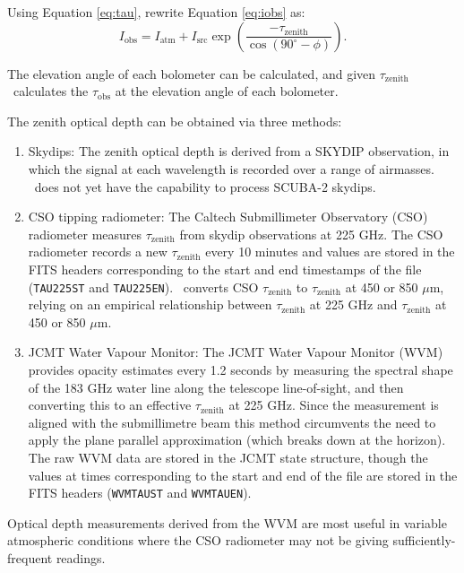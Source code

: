 \documentclass[oneside,11pt]{starlink}
\begin{document}
Using Equation \ref{eq:tau}, rewrite Equation \ref{eq:iobs} as:
\begin{equation}
I_{\textrm{obs}} = I_{\textrm{atm}} + I_{\textrm{src}} \exp \left(
\frac{-\tau_{\textrm{zenith}}}{\cos(90^\circ-\phi)}\right).
\end{equation}

The elevation angle of each bolometer can be calculated, and given
$\tau_{\textrm{zenith}}$ \remsky\ calculates the $\tau_{\textrm{obs}}$ at the
elevation angle of each bolometer.

The zenith optical depth can be obtained via three methods:
\begin{enumerate}
\item Skydips: The zenith optical depth is derived from a SKYDIP
  observation, in which the signal at each wavelength is recorded over
  a range of airmasses. \SMURF\ does not yet have the capability to
  process SCUBA-2 skydips.

\item CSO tipping radiometer: The Caltech Submillimeter Observatory
  (CSO) radiometer measures $\tau_{\textrm{zenith}}$ from skydip
  observations at 225 GHz. The CSO radiometer records a new $\tau_{\textrm{zenith}}$ every 10 minutes and values are stored in the FITS
  headers corresponding to the start and end timestamps of the file
  (\texttt{TAU225ST} and \texttt{TAU225EN}). \SMURF\ converts CSO
  $\tau_{\textrm{zenith}}$ to $\tau_{\textrm{zenith}}$ at 450 or 850 $\mu$m,
  relying on an empirical relationship between $\tau_{\textrm{zenith}}$ at
  225 GHz and $\tau_{\textrm{zenith}}$ at 450 or 850 $\mu$m.

\item JCMT Water Vapour Monitor: The JCMT Water Vapour Monitor (WVM)
  provides opacity estimates every 1.2 seconds by measuring the
  spectral shape of the 183 GHz water line along the telescope
  line-of-sight, and then converting this to an effective $\tau_{\textrm{zenith}}$ at 225 GHz. Since the measurement is aligned with the
  submillimetre beam this method circumvents the need to apply the
  plane parallel approximation (which breaks down at the horizon). The
  raw WVM data are stored in the JCMT state structure, though the
  values at times corresponding to the start and end of the file are
  stored in the FITS headers (\texttt{WVMTAUST} and
  \texttt{WVMTAUEN}).
\end{enumerate}
Optical depth measurements derived from the WVM are most useful in
variable atmospheric conditions where the CSO radiometer may not be
giving sufficiently-frequent readings.
\end{document}
